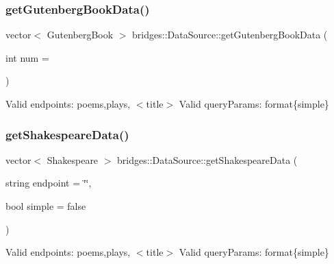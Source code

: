 \mbox{\label{namespacebridges_1_1_data_source_a8146b00565286727e8206e377d9ff5bd}} 
\subsubsection{\texorpdfstring{get\+Gutenberg\+Book\+Data()}{getGutenbergBookData()}}
{\footnotesize\ttfamily vector$<$ Gutenberg\+Book $>$ bridges\+::\+Data\+Source\+::get\+Gutenberg\+Book\+Data (\begin{DoxyParamCaption}\item[{int}]{num = {} }\end{DoxyParamCaption})}

Valid endpoints\+: \textquotesingle{}poems\textquotesingle{},\textquotesingle{}plays\textquotesingle{}, $<$title$>$ Valid query\+Params\+: format\{simple\} \mbox{\label{namespacebridges_1_1_data_source_abdf2e4d709e9b7f1a5370726676d86ec}} 
\subsubsection{\texorpdfstring{get\+Shakespeare\+Data()}{getShakespeareData()}}
{\footnotesize\ttfamily vector$<$ Shakespeare $>$ bridges\+::\+Data\+Source\+::get\+Shakespeare\+Data (\begin{DoxyParamCaption}\item[{string}]{endpoint = {\ttfamily \char`\"{}\char`\"{}},  }\item[{bool}]{simple = {\ttfamily false} }\end{DoxyParamCaption})}

Valid endpoints\+: \textquotesingle{}poems\textquotesingle{},\textquotesingle{}plays\textquotesingle{}, $<$title$>$ Valid query\+Params\+: format\{simple\} 